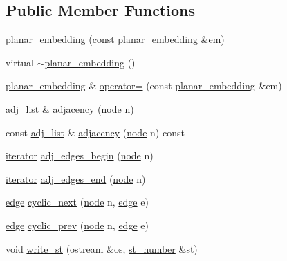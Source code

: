\subsection*{Public Member Functions}
\begin{DoxyCompactItemize}
\item 
\mbox{\hyperlink{classplanar__embedding_ac3bce79522ec180819470bd0370eda87}{planar\+\_\+embedding}} (const \mbox{\hyperlink{classplanar__embedding}{planar\+\_\+embedding}} \&em)
\item 
virtual \mbox{\hyperlink{classplanar__embedding_ae5605eb5f21346f3f8194dd2db9de117}{$\sim$planar\+\_\+embedding}} ()
\item 
\mbox{\hyperlink{classplanar__embedding}{planar\+\_\+embedding}} \& \mbox{\hyperlink{classplanar__embedding_afb772a5c6a3a03fafa6bbc17a4c42a23}{operator=}} (const \mbox{\hyperlink{classplanar__embedding}{planar\+\_\+embedding}} \&em)
\item 
\mbox{\hyperlink{classsymlist}{adj\+\_\+list}} \& \mbox{\hyperlink{classplanar__embedding_a151a1e7cf6cfbbd0a09c467ec8bc61d1}{adjacency}} (\mbox{\hyperlink{classnode}{node}} n)
\item 
const \mbox{\hyperlink{classsymlist}{adj\+\_\+list}} \& \mbox{\hyperlink{classplanar__embedding_aa52d4454ff761f0130e8739a53efbe83}{adjacency}} (\mbox{\hyperlink{classnode}{node}} n) const
\item 
\mbox{\hyperlink{structsymlist__iterator}{iterator}} \mbox{\hyperlink{classplanar__embedding_ac0b41dd43adb80ed898b597e791230d8}{adj\+\_\+edges\+\_\+begin}} (\mbox{\hyperlink{classnode}{node}} n)
\item 
\mbox{\hyperlink{structsymlist__iterator}{iterator}} \mbox{\hyperlink{classplanar__embedding_a1345ee93995019d81cc78fb2806acc88}{adj\+\_\+edges\+\_\+end}} (\mbox{\hyperlink{classnode}{node}} n)
\item 
\mbox{\hyperlink{classedge}{edge}} \mbox{\hyperlink{classplanar__embedding_a4498733be831e1468044db038452efa4}{cyclic\+\_\+next}} (\mbox{\hyperlink{classnode}{node}} n, \mbox{\hyperlink{classedge}{edge}} e)
\item 
\mbox{\hyperlink{classedge}{edge}} \mbox{\hyperlink{classplanar__embedding_ae4d5e8226c1088c17e15ee6447133383}{cyclic\+\_\+prev}} (\mbox{\hyperlink{classnode}{node}} n, \mbox{\hyperlink{classedge}{edge}} e)
\item 
void \mbox{\hyperlink{classplanar__embedding_ab2870ca51d0df44f8006ab69c3ee74d4}{write\+\_\+st}} (ostream \&os, \mbox{\hyperlink{classst__number}{st\+\_\+number}} \&st)
\item 

\end{DoxyCompactItemize}

